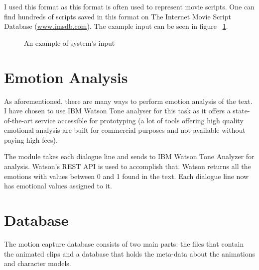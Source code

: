 I used this format as this format is often used to represent movie scripts. One can find hundreds of scripts saved in this format on The Internet Movie Script Database (\url{www.imsdb.com}). The example input can be seen in figure ~\ref{fig:inputscript}.


\begin{figure}[H]
\centerline{}
\caption{An example of system's input}\label{fig:inputscript}
\end{figure}


\section{Emotion Analysis} 
\label{sec:emoanal}
As aforementioned, there are many ways to perform emotion analysis of the text. I have chosen to use IBM Watson Tone analyser for this task as it offers a state-of-the-art service accessible for prototyping (a lot of tools offering high quality emotional analysis are built for commercial purposes and not available without paying high fees).

The module takes each dialogue line and sends to IBM Watson Tone Analyzer for analysis. Watson's REST API is used to accomplish that. Watson returns all the emotions with values between 0 and 1 found in the text. Each dialogue line now has emotional values assigned to it.

\section{Database}
\label{sec:dbdesign}

The motion capture database consists of two main parts: the files that contain the animated clips and a database that holds the meta-data about the animations and character models.

